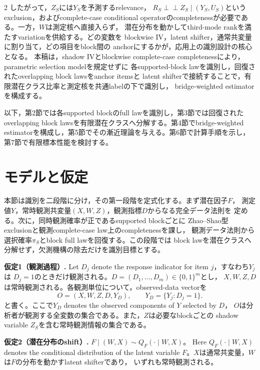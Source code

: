 \documentclass[a4paper,10pt]{article}
\newcommand{\indep}{\mathrel{\perp\!\!\!\perp}}
\begin{document}
\begin{multicols}{2}
したがって，$Z_S$には$Y_S$を予測するrelevance，
$R_S\indep Z_S\mid(Y_S,U_S)$というexclusion，およびcomplete-case conditional
operatorのcompletenessが必要である。一方，$W$は測定核へ直接入らず，
潜在分布を動かしてthird-mode rankを満たすvariationを供給する。どの変数を
blockwise IV，latent shifter，通常共変量に割り当て，どの項目をblock間の
anchorにするかが，応用上の識別設計の核心となる。
本稿は，shadow IVとblockwise complete-case completenessにより，parametric selection modelを規定せずに
各supported-block lawを識別し，回復されたoverlapping block lawsをanchor itemsと
latent shifterで接続することで，有限潜在クラス比率と測定核を共通labelの下で識別し，
bridge-weighted estimatorを構成する。

以下，第2節では各supported blockのfull lawを識別し，第3節では回復された
overlapping block lawsを有限潜在クラスへ分解する。第4節でbridge-weighted
estimatorを構成し，第5節でその漸近理論を与える。第6節で計算手順を示し，
第7節で有限標本性能を検討する。

\section{モデルと仮定}
本節は識別を二段階に分け，その第一段階を定式化する。まず潜在因子$F$，
測定値$Y$，常時観測共変量$(X,W,Z)$，観測指標$D$からなる完全データ法則を
定める。次に，同時観測確率が正であるsupported blockごとに
Zhao--Shao型exclusionと観測complete-case law上のcompletenessを課し，
観測データ法則から選択確率$\pi_S$とblock full lawを回復する。この段階では
block lawを潜在クラスへ分解せず，欠測機構の除去だけを識別目標とする。

\noindent\textbf{仮定1（観測過程）.}
Let $D_j$ denote the response indicator for item $j$，すなわち$Y_j$は
$D_j=1$のときだけ観測される。$D=(D_1,\ldots,D_m)\in\{0,1\}^m$とし，
$X,W,Z,D$は常時観測される。各観測単位について，observed-data vectorを
\begin{equation}
O=(X,W,Z,D,Y_D),\qquad Y_D=\{Y_j:D_j=1\}.
\label{eq:observed-data}
\end{equation}
と書く。ここで$Y_D$ denotes the observed components of $Y$ selected by $D$，
$O$は分析者が観測する全変数の集合である。また，$Z$は必要なblockごとの
shadow variable $Z_S$を含む常時観測情報の集合である。

\noindent\textbf{仮定2（潜在分布のshift）.}
$F\mid(W,X)\sim Q_F(\cdot\mid W,X)$。
Here $Q_F(\cdot\mid W,X)$ denotes the conditional distribution of the latent
variable $F$。$X$は通常共変量，$W$は$F$の分布を動かすlatent shifterであり，
いずれも常時観測される。


\end{multicols}
\end{document}
